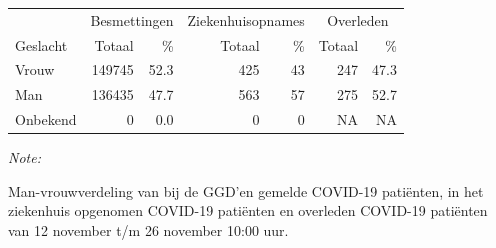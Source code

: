 \documentclass[
  english,
  man,floatsintext]{apa6}
\begin{document}
\begin{table}
\centering\begingroup\fontsize{11}{13}\selectfont

\begin{threeparttable}
\begin{tabular}{lrrrrrr}
\toprule
\multicolumn{1}{c}{ } & \multicolumn{2}{c}{Besmettingen} & \multicolumn{2}{c}{Ziekenhuisopnames} & \multicolumn{2}{c}{Overleden} \\
\cmidrule(l{3pt}r{3pt}){2-3} \cmidrule(l{3pt}r{3pt}){4-5} \cmidrule(l{3pt}r{3pt}){6-7}
Geslacht & Totaal & \% & Totaal & \% & Totaal & \%\\
\midrule
Vrouw & 149745 & 52.3 & 425 & 43 & 247 & 47.3\\
Man & 136435 & 47.7 & 563 & 57 & 275 & 52.7\\
Onbekend & 0 & 0.0 & 0 & 0 & NA & NA\\
\bottomrule
\end{tabular}
\begin{tablenotes}
\item \textit{Note: } 
\item Man-vrouwverdeling van bij de GGD’en gemelde COVID-19 patiënten, in het ziekenhuis opgenomen COVID-19 patiënten en overleden COVID-19 patiënten van 12 november t/m 26 november 10:00 uur.
\end{tablenotes}
\end{threeparttable}
\endgroup{}
\end{table}
\newpage
\end{document}
